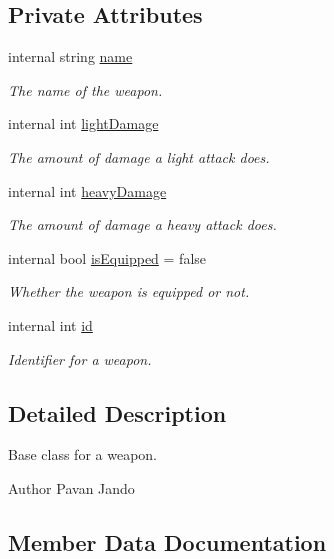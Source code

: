 \subsection*{Private Attributes}
\begin{DoxyCompactItemize}
\item 
internal string \mbox{\hyperlink{class_item_a4f06d4968b81d435f946898640e51e03}{name}}
\begin{DoxyCompactList}\small\item\em The name of the weapon. \end{DoxyCompactList}\item 
internal int \mbox{\hyperlink{class_item_a9ae19965752f0c33f80ed0b361f8172c}{light\+Damage}}
\begin{DoxyCompactList}\small\item\em The amount of damage a light attack does. \end{DoxyCompactList}\item 
internal int \mbox{\hyperlink{class_item_a227d7568e031387e5380ee310195d33d}{heavy\+Damage}}
\begin{DoxyCompactList}\small\item\em The amount of damage a heavy attack does. \end{DoxyCompactList}\item 
internal bool \mbox{\hyperlink{class_item_afad013640f1c29591ae9977169888fec}{is\+Equipped}} = false
\begin{DoxyCompactList}\small\item\em Whether the weapon is equipped or not. \end{DoxyCompactList}\item 
internal int \mbox{\hyperlink{class_item_a9984ca55c1a202a7f57cabded88bd929}{id}}
\begin{DoxyCompactList}\small\item\em Identifier for a weapon. \end{DoxyCompactList}\end{DoxyCompactItemize}


\subsection{Detailed Description}
Base class for a weapon. 

\begin{DoxyAuthor}{Author}
Pavan Jando
\end{DoxyAuthor}


\subsection{Member Data Documentation}
\mbox{\label{class_item_a227d7568e031387e5380ee310195d33d}} 
